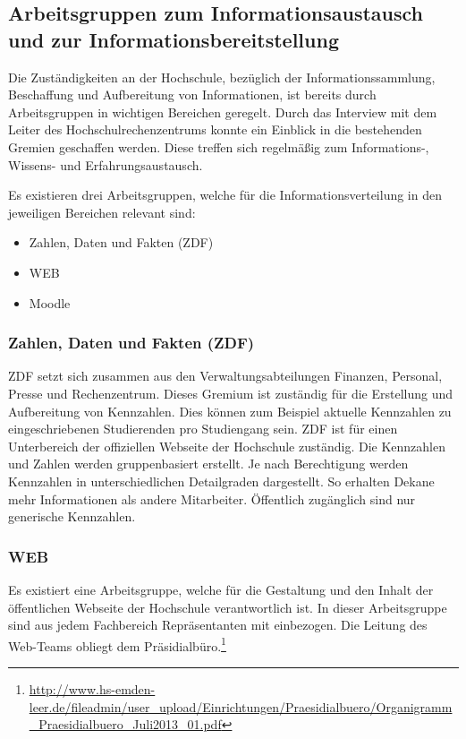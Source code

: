 \subsection{Arbeitsgruppen zum Informationsaustausch und zur Informationsbereitstellung}
\label{subsection_arbeitsgruppen_informationsaustausch}
Die Zuständigkeiten an der Hochschule, bezüglich der Informationssammlung, Beschaffung und Aufbereitung von Informationen, ist bereits durch Arbeitsgruppen in wichtigen Bereichen geregelt. Durch das Interview mit dem Leiter des Hochschulrechenzentrums konnte ein Einblick in die bestehenden Gremien geschaffen werden. Diese treffen sich regelmäßig zum Informations-, Wissens- und Erfahrungsaustausch.

Es existieren drei Arbeitsgruppen, welche für die Informationsverteilung in den jeweiligen Bereichen relevant sind:

\begin{itemize}
	\item Zahlen, Daten und Fakten (ZDF)
	\item WEB
	\item Moodle
\end{itemize}

\subsubsection{Zahlen, Daten und Fakten (ZDF)}
ZDF setzt sich zusammen aus den Verwaltungsabteilungen Finanzen, Personal, Presse und Rechenzentrum. Dieses Gremium ist zuständig für die Erstellung und Aufbereitung von Kennzahlen. Dies können zum Beispiel aktuelle Kennzahlen zu eingeschriebenen Studierenden pro Studiengang sein.  ZDF ist für einen Unterbereich der offiziellen Webseite der Hochschule zuständig. Die Kennzahlen und Zahlen werden gruppenbasiert erstellt. Je nach Berechtigung werden Kennzahlen in unterschiedlichen Detailgraden dargestellt. So erhalten Dekane mehr Informationen als andere Mitarbeiter. Öffentlich zugänglich sind nur generische Kennzahlen. 

\subsubsection{WEB}
Es existiert eine Arbeitsgruppe, welche für die Gestaltung und den Inhalt der öffentlichen Webseite der Hochschule verantwortlich ist. In dieser Arbeitsgruppe sind aus jedem Fachbereich Repräsentanten mit einbezogen. Die Leitung des Web-Teams obliegt dem Präsidialbüro.\footnote{\url{http://www.hs-emden-leer.de/fileadmin/user_upload/Einrichtungen/Praesidialbuero/Organigramm_Praesidialbuero_Juli2013_01.pdf}}


